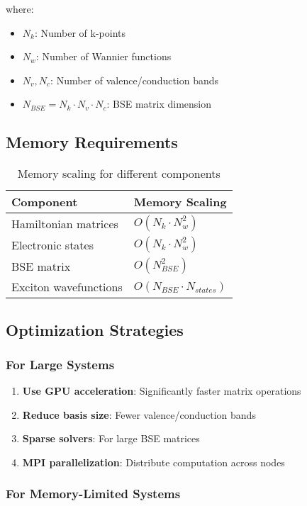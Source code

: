 \documentclass[11pt,a4paper]{article}
\begin{document}
where:
\begin{itemize}
    \item $N_k$: Number of k-points
    \item $N_w$: Number of Wannier functions
    \item $N_v, N_c$: Number of valence/conduction bands
    \item $N_{BSE} = N_k \cdot N_v \cdot N_c$: BSE matrix dimension
\end{itemize}

\subsection{Memory Requirements}

\begin{table}[H]
\centering
\begin{tabular}{ll}
\toprule
Component & Memory Scaling \\
\midrule
Hamiltonian matrices & $O(N_k \cdot N_w^2)$ \\
Electronic states & $O(N_k \cdot N_w^2)$ \\
BSE matrix & $O(N_{BSE}^2)$ \\
Exciton wavefunctions & $O(N_{BSE} \cdot N_{states})$ \\
\bottomrule
\end{tabular}
\caption{Memory scaling for different components}
\end{table}

\subsection{Optimization Strategies}

\subsubsection{For Large Systems}

\begin{enumerate}
    \item \textbf{Use GPU acceleration}: Significantly faster matrix operations
    \item \textbf{Reduce basis size}: Fewer valence/conduction bands
    \item \textbf{Sparse solvers}: For large BSE matrices
    \item \textbf{MPI parallelization}: Distribute computation across nodes
\end{enumerate}

\subsubsection{For Memory-Limited Systems}
\end{document}
